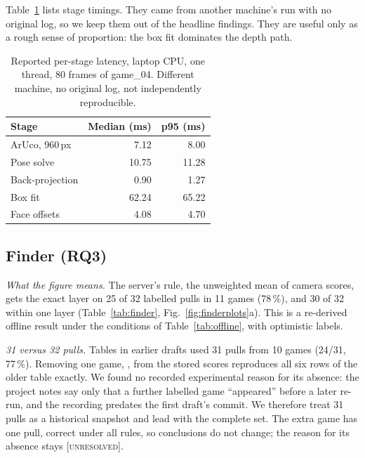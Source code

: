 \documentclass[conference,10pt]{IEEEtran}
\newcommand{\code}[1]{\texttt{\small\detokenize{#1}}}
\newcommand{\evU}{\textsc{[unresolved]}}
\begin{document}
Table~\ref{tab:latency} lists stage timings. They came from another machine's run with no original log, so we keep them out of the headline findings. They are useful only as a rough sense of proportion: the box fit dominates the depth path.

\begin{table}[!t]
\caption{Reported per-stage latency, laptop CPU, one thread, 80 frames of game\_04. Different machine, no original log, not independently reproducible.}\label{tab:latency}
\centering\footnotesize
\begin{tabular}{@{}lrr@{}}
\toprule
Stage & Median (ms) & p95 (ms) \\
\midrule
ArUco, 960\,px & 7.12 & 8.00 \\
Pose solve & 10.75 & 11.28 \\
Back-projection & 0.90 & 1.27 \\
Box fit & 62.24 & 65.22 \\
Face offsets & 4.08 & 4.70 \\
\bottomrule
\end{tabular}
\end{table}

\subsection{Finder (RQ3)}
\emph{What the figure means.} The server's rule, the unweighted mean of camera scores, gets the exact layer on 25 of 32 labelled pulls in 11 games (78\,\%), and 30 of 32 within one layer (Table~\ref{tab:finder}, Fig.~\ref{fig:finderplots}a). This is a re-derived offline result under the conditions of Table~\ref{tab:offline}, with optimistic labels.

\emph{31 versus 32 pulls.} Tables in earlier drafts used 31 pulls from 10 games (24/31, 77\,\%). Removing one game, \code{live_20261106_093055}, from the stored scores reproduces all six rows of the older table exactly. We found no recorded experimental reason for its absence: the project notes say only that a further labelled game ``appeared'' before a later re-run, and the recording predates the first draft's commit. We therefore treat 31 pulls as a historical snapshot and lead with the complete set. The extra game has one pull, correct under all rules, so conclusions do not change; the reason for its absence stays \evU.
\end{document}

